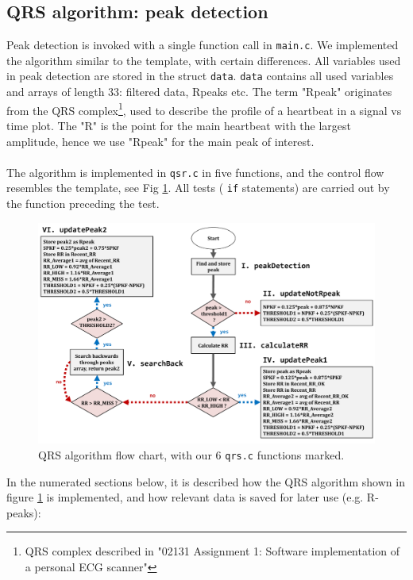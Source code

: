 \subsection{QRS algorithm: peak detection}
\label{sx:QRSalg}
Peak detection is invoked with a single function call in \texttt{main.c}. We implemented the algorithm similar to the template, with certain differences. All variables used in peak detection are stored in the struct \texttt{data}. \texttt{data} contains all used variables and arrays of length 33: filtered data, Rpeaks etc. The term "Rpeak" originates from the QRS complex\footnote{QRS complex described in "02131 Assignment 1: Software implementation of a personal ECG scanner"}, used to describe the profile of a heartbeat in a signal vs time plot. The "R" is the point for the main heartbeat with the largest amplitude, hence we use "Rpeak" for the main peak of interest.\\
\\
The algorithm is implemented in \texttt{qsr.c} in five functions, and the control flow resembles the template, see Fig \ref{fig:QRS_flowchart}. All tests (\color{blue} \texttt{if} \color{black} statements) are carried out by the function preceding the test.

\begin{figure}[H]
    \centering
    \includegraphics[width=1.0\textwidth]{1Design/fig/QRS.pdf}
    \caption{QRS algorithm flow chart, with our 6 \texttt{qrs.c} functions marked.}
    \label{fig:QRS_flowchart}
\end{figure}

In the numerated sections below, it is described how the QRS algorithm shown in figure \ref{fig:QRS_flowchart} is implemented, and how relevant data is saved for later use (e.g. R-peaks):

